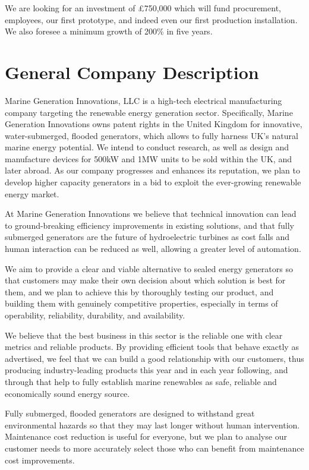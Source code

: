 \documentclass[a4paper,11pt]{article}
\begin{document}
We are looking for an investment of £750,000 which will fund procurement, employees, our first prototype, and indeed even our first production installation. We also foresee a minimum growth of 200\% in five years.
\pagebreak

\section{General Company Description}
Marine Generation Innovations, LLC is a high-tech electrical manufacturing company targeting the renewable energy generation sector. Specifically, Marine Generation Innovations owns patent rights in the United Kingdom for innovative, water-submerged, flooded generators, which allows to fully harness UK's natural marine energy potential. We intend to conduct research, as well as design and manufacture devices for 500kW and 1MW units to be sold within the UK, and later abroad. As our company progresses and enhances its reputation, we plan to develop higher capacity generators in a bid to exploit the ever-growing renewable energy market.

At Marine Generation Innovations we believe that technical innovation can lead to ground-breaking efficiency improvements in existing solutions, and that fully submerged generators are the future of hydroelectric turbines as cost falls and human interaction can be reduced as well, allowing a greater level of automation.

We aim to provide a clear and viable alternative to sealed energy generators so that customers may make their own decision about which solution is best for them, and we plan to achieve this by thoroughly testing our product, and building them with genuinely competitive properties, especially in terms of operability, reliability, durability, and availability.

We believe that the best business in this sector is the reliable one with clear metrics and reliable products. By providing efficient tools that behave exactly as advertised, we feel that we can build a good relationship with our customers, thus producing industry-leading products this year and in each year following, and through that help to fully establish marine renewables as safe, reliable and economically sound energy source.

Fully submerged, flooded generators are designed to withstand great environmental hazards so that they may last longer without human intervention. Maintenance cost reduction is useful for everyone, but we plan to analyse our customer needs to more accurately select those who can benefit from maintenance cost improvements.
\end{document}
